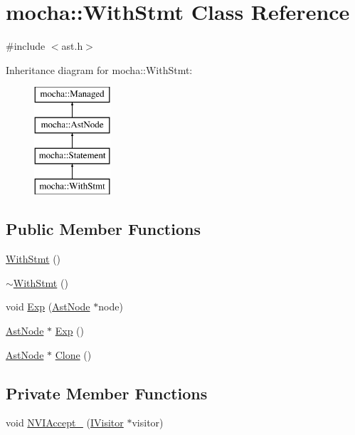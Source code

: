 \hypertarget{classmocha_1_1_with_stmt}{
\section{mocha::WithStmt Class Reference}
\label{classmocha_1_1_with_stmt}
}


{\ttfamily \#include $<$ast.h$>$}

Inheritance diagram for mocha::WithStmt:\begin{figure}[H]
\begin{center}
\leavevmode
\includegraphics[height=4.000000cm]{classmocha_1_1_with_stmt}
\end{center}
\end{figure}
\subsection*{Public Member Functions}
\begin{DoxyCompactItemize}
\item 
\hyperlink{classmocha_1_1_with_stmt_a40ef105e0b4b756e44c4c3a6b001e53d}{WithStmt} ()
\item 
\hyperlink{classmocha_1_1_with_stmt_aeee964adce6009c38d14742642ab6554}{$\sim$WithStmt} ()
\item 
void \hyperlink{classmocha_1_1_with_stmt_afb723d11621e3e2f7d1037b5cbe1f57f}{Exp} (\hyperlink{classmocha_1_1_ast_node}{AstNode} $\ast$node)
\item 
\hyperlink{classmocha_1_1_ast_node}{AstNode} $\ast$ \hyperlink{classmocha_1_1_with_stmt_aa148e67ebe05901e8c243ae2e4993ddb}{Exp} ()
\item 
\hyperlink{classmocha_1_1_ast_node}{AstNode} $\ast$ \hyperlink{classmocha_1_1_with_stmt_ab9cc83bec679ea022ee8711c9ce9d01b}{Clone} ()
\end{DoxyCompactItemize}
\subsection*{Private Member Functions}
\begin{DoxyCompactItemize}
\item 
void \hyperlink{classmocha_1_1_with_stmt_a3a24b05de3590e14097cb308a6ce636f}{NVIAccept\_\-} (\hyperlink{classmocha_1_1_i_visitor}{IVisitor} $\ast$visitor)
\end{DoxyCompactItemize}
